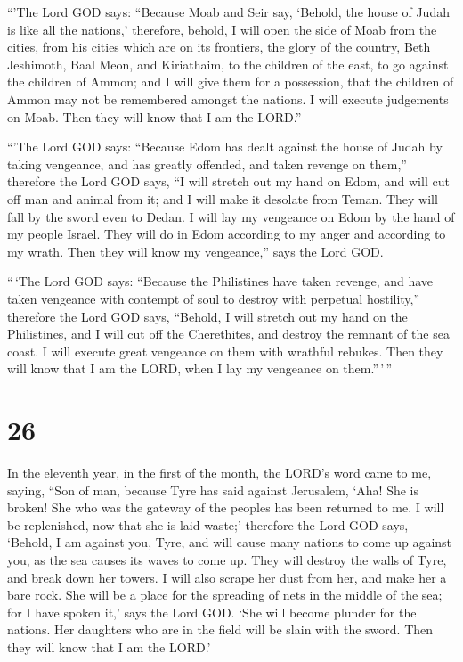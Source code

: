  ``'The Lord GOD says: ``Because Moab and Seir say,
`Behold, the house of Judah is like all the nations,' 
therefore, behold, I will open the side of Moab from the cities, from
his cities which are on its frontiers, the glory of the country, Beth
Jeshimoth, Baal Meon, and Kiriathaim,  to the children of
the east, to go against the children of Ammon; and I will give them for
a possession, that the children of Ammon may not be remembered amongst
the nations.  I will execute judgements on Moab. Then
they will know that I am the LORD.''

 ``'The Lord GOD says: ``Because Edom has dealt against
the house of Judah by taking vengeance, and has greatly offended, and
taken revenge on them,''  therefore the Lord GOD says,
``I will stretch out my hand on Edom, and will cut off man and animal
from it; and I will make it desolate from Teman. They will fall by the
sword even to Dedan.  I will lay my vengeance on Edom by
the hand of my people Israel. They will do in Edom according to my anger
and according to my wrath. Then they will know my vengeance,'' says the
Lord GOD.

 ``\,`The Lord GOD says: ``Because the Philistines have
taken revenge, and have taken vengeance with contempt of soul to destroy
with perpetual hostility,''  therefore the Lord GOD says,
``Behold, I will stretch out my hand on the Philistines, and I will cut
off the Cherethites, and destroy the remnant of the sea coast.
 I will execute great vengeance on them with wrathful
rebukes. Then they will know that I am the LORD, when I lay my vengeance
on them.''\,'\,''

\hypertarget{section-24}{%
\section{26}\label{section-24}}

 In the eleventh year, in the first of the month, the
LORD's word came to me, saying,  ``Son of man, because
Tyre has said against Jerusalem, `Aha! She is broken! She who was the
gateway of the peoples has been returned to me. I will be replenished,
now that she is laid waste;'  therefore the Lord GOD says,
`Behold, I am against you, Tyre, and will cause many nations to come up
against you, as the sea causes its waves to come up.  They
will destroy the walls of Tyre, and break down her towers. I will also
scrape her dust from her, and make her a bare rock.  She
will be a place for the spreading of nets in the middle of the sea; for
I have spoken it,' says the Lord GOD. `She will become plunder for the
nations.  Her daughters who are in the field will be slain
with the sword. Then they will know that I am the LORD.'

